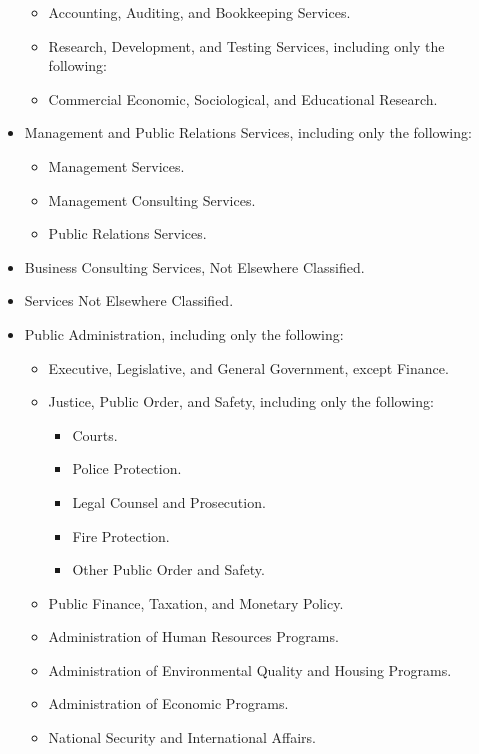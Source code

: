 \begin{itemize}
\begin{itemize}
\item Accounting, Auditing, and Bookkeeping Services.

\item Research, Development, and Testing Services, including only the following:

\item Commercial Economic, Sociological, and Educational Research.
\end{itemize}
\item Management and Public Relations Services, including only the following:
\begin{itemize}
\item Management Services.

\item Management Consulting Services.

\item Public Relations Services.
\end{itemize}
\item Business Consulting Services, Not Elsewhere Classified.

\item Services Not Elsewhere Classified.

\item Public Administration, including only the following:
\begin{itemize}
\item Executive, Legislative, and General Government, except Finance.

\item Justice, Public Order, and Safety, including only the following:
\begin{itemize}
\item Courts.

\item Police Protection.

\item Legal Counsel and Prosecution.

\item Fire Protection.

\item Other Public Order and Safety.
\end{itemize}
\item Public Finance, Taxation, and Monetary Policy.

\item Administration of Human Resources Programs.

\item Administration of Environmental Quality and Housing Programs.

\item Administration of Economic Programs.

\item National Security and International Affairs.
\end{itemize}
\end{itemize}

